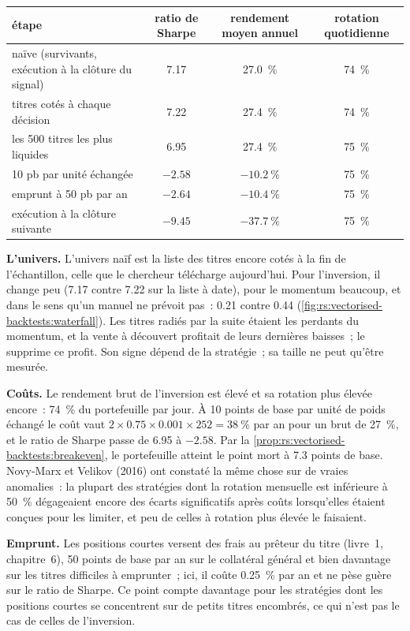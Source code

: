 \begin{center}
\small
\begin{tabular}{@{}p{5.4cm}ccc@{}}
\toprule
étape & ratio de Sharpe & rendement moyen annuel & rotation quotidienne\\
\midrule
naïve (survivants, exécution à la clôture du signal) & 7.17 & 27.0~\% & 74~\%\\
titres cotés à chaque décision & 7.22 & 27.4~\% & 74~\%\\
les 500 titres les plus liquides & 6.95 & 27.4~\% & 75~\%\\
10 pb par unité échangée & $-2.58$ & $-10.2~\%$ & 75~\%\\
emprunt à 50 pb par an & $-2.64$ & $-10.4~\%$ & 75~\%\\
exécution à la clôture suivante & $-9.45$ & $-37.7~\%$ & 75~\%\\
\bottomrule
\end{tabular}
\end{center}

\textbf{L'univers.} L'univers naïf est la liste des titres encore cotés à la fin de l'échantillon, celle que le chercheur télécharge aujourd'hui. Pour
l'inversion, il change peu (7.17 contre 7.22 sur la liste à date), pour le momentum beaucoup, et dans le sens qu'un manuel
ne prévoit pas~: 0.21 contre 0.44 (\cref{fig:rs:vectorised-backtests:waterfall}). Les titres radiés par la suite étaient les perdants du momentum, et la
vente à découvert profitait de leurs dernières baisses~; le  supprime ce profit. Son signe dépend de la stratégie~; sa taille ne peut qu'être mesurée.

\textbf{Coûts.} Le rendement brut de l'inversion est élevé et sa rotation plus élevée encore~: 74~\% du portefeuille par jour. À 10 points de base par unité de poids échangé
le coût vaut $2 \times 0.75 \times 0.001 \times 252 = 38~\%$ par an pour un brut de 27~\%, et le ratio de Sharpe passe de 6.95 à $-2.58$. Par
la \cref{prop:rs:vectorised-backtests:breakeven}, le portefeuille atteint le point mort à 7.3 points de base. Novy-Marx et Velikov (2016) ont constaté la même chose sur de vraies
anomalies~: la plupart des stratégies dont la rotation mensuelle est inférieure à 50~\% dégageaient encore des écarts significatifs après coûts lorsqu'elles étaient conçues pour les limiter, et peu
de celles à rotation plus élevée le faisaient.

\textbf{Emprunt.} Les positions courtes versent des frais au prêteur du titre (livre~1, chapitre~6), 50 points de base par an sur le collatéral général et bien davantage
sur les titres difficiles à emprunter~; ici, il coûte 0.25~\% par an et ne pèse guère sur le ratio de Sharpe. Ce point compte davantage pour les stratégies dont les positions courtes se concentrent sur de petits
titres encombrés, ce qui n'est pas le cas de celles de l'inversion.

